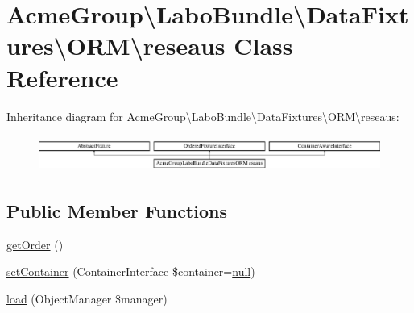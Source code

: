 \hypertarget{class_acme_group_1_1_labo_bundle_1_1_data_fixtures_1_1_o_r_m_1_1reseaus}{\section{Acme\+Group\textbackslash{}Labo\+Bundle\textbackslash{}Data\+Fixtures\textbackslash{}O\+R\+M\textbackslash{}reseaus Class Reference}
\label{class_acme_group_1_1_labo_bundle_1_1_data_fixtures_1_1_o_r_m_1_1reseaus}
}
Inheritance diagram for Acme\+Group\textbackslash{}Labo\+Bundle\textbackslash{}Data\+Fixtures\textbackslash{}O\+R\+M\textbackslash{}reseaus\+:\begin{figure}[H]
\begin{center}
\leavevmode
\includegraphics[height=1.185185cm]{class_acme_group_1_1_labo_bundle_1_1_data_fixtures_1_1_o_r_m_1_1reseaus}
\end{center}
\end{figure}
\subsection*{Public Member Functions}
\begin{DoxyCompactItemize}
\item 
\hyperlink{class_acme_group_1_1_labo_bundle_1_1_data_fixtures_1_1_o_r_m_1_1reseaus_aedda27878d2f35ba4c9921e937f8b11e}{get\+Order} ()
\item 
\hyperlink{class_acme_group_1_1_labo_bundle_1_1_data_fixtures_1_1_o_r_m_1_1reseaus_abd98f0a9946b9c94bce4f460f7344d04}{set\+Container} (Container\+Interface \$container=\hyperlink{validate_8js_afb8e110345c45e74478894341ab6b28e}{null})
\item 
\hyperlink{class_acme_group_1_1_labo_bundle_1_1_data_fixtures_1_1_o_r_m_1_1reseaus_a8e91d97b1345c72f4ba5b60ecc741dc7}{load} (Object\+Manager \$manager)
\end{DoxyCompactItemize}


